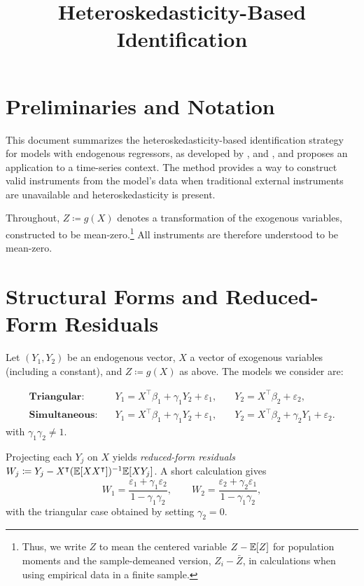 \newcommand{\T}{^{\intercal}}
\makeatother



\title{Heteroskedasticity-Based Identification}
\author{}
\maketitle

\section{Preliminaries and Notation}

This document summarizes the heteroskedasticity-based identification
strategy for models with endogenous regressors, as developed by \textcite{lewbel2012},
\textcite{rigobon2003} and \textcite{prono2014}, and proposes an
application to a time-series context. The method provides a way to
construct valid instruments from the model's data when traditional
external instruments are unavailable and heteroskedasticity is present.

Throughout, $Z\coloneqq g(X)$ denotes a transformation of the exogenous
variables, constructed to be mean-zero.\footnote{Thus, we write $Z$ to mean the centered variable $Z-\mathbb{E}[Z]$ for population
moments and the sample-demeaned version, $Z_{i}-\bar{Z}$, in calculations
when using empirical data in a finite sample.} All instruments are therefore understood to be mean-zero.

\section{Structural Forms and Reduced-Form Residuals}

Let $(Y_{1},Y_{2})$ be an endogenous vector, $X$ a vector of exogenous
variables (including a constant), and $Z\coloneqq g(X)$ as above.
The models we consider are:

\begin{align*}
\textbf{Triangular:}\quad & Y_{1}=X\T\beta_{1}+\gamma_{1}Y_{2}+\varepsilon_{1}, & \quad Y_{2}=X\T\beta_{2}+\varepsilon_{2},\\[3pt]
\textbf{Simultaneous:}\quad & Y_{1}=X\T\beta_{1}+\gamma_{1}Y_{2}+\varepsilon_{1}, & \quad Y_{2}=X\T\beta_{2}+\gamma_{2}Y_{1}+\varepsilon_{2}.
\end{align*}
with $\gamma_{1}\gamma_{2}\neq1$.

Projecting each $Y_{j}$ on $X$ yields \emph{reduced-form residuals}
$W_{j}\coloneqq Y_{j}-X\T(\E[XX\T])^{-1}\E[XY_{j}]$. A short calculation
gives
\[
W_{1}=\frac{\varepsilon_{1}+\gamma_{1}\varepsilon_{2}}{1-\gamma_{1}\gamma_{2}},\qquad W_{2}=\frac{\varepsilon_{2}+\gamma_{2}\varepsilon_{1}}{1-\gamma_{1}\gamma_{2}},
\]
with the triangular case obtained by setting $\gamma_{2}=0$.

